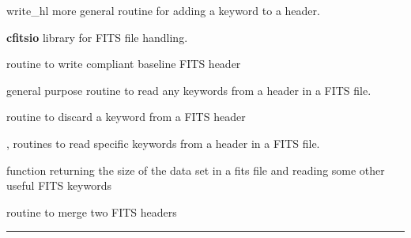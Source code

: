\begin{modules}
  \begin{sulist}{} %
  \item[write\_hl] more general routine for adding a keyword to a header.
  \item[\textbf{cfitsio}] library for FITS file handling.		
  \end{sulist}
\end{modules}

\begin{related}
  \begin{sulist}{} %
  \item[\htmlref{write\_minimal\_header}{sub:write_minimal_header}] routine to
write \healpix compliant baseline FITS header
  \item[\htmlref{get\_card}{sub:get_card}] general purpose routine to read any keywords from a header in a FITS file.
  \item[\htmlref{del\_card}{sub:del_card}] routine to discard a keyword from a FITS header
  \item[\htmlref{read\_par}{sub:read_par}, \htmlref{number\_of\_alms}{sub:number_of_alms}] routines to read specific keywords from a
  header in a FITS file.
  \item[\htmlref{getsize\_fits}{sub:getsize_fits}] function returning the size of the data set in a fits
  file and reading some other useful FITS keywords
  \item[\htmlref{merge\_headers}{sub:merge_headers}] routine to merge two FITS headers
  \end{sulist}
\end{related}

\rule{\hsize}{2mm}

\newpage
